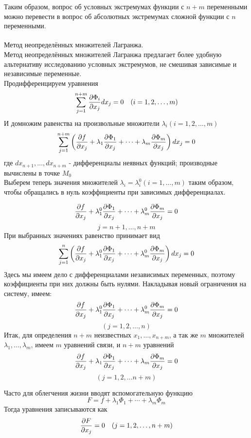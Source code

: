 Таким образом, вопрос об условных экстремумах функции с $n+m$ переменными можно перевести в вопрос об абсолютных экстремумах сложной функции с $n$ переменными.\\
\\

Метод неопределённых множителей Лагранжа.\\

Метод неопределённых множителей Лагранжа предлагает более удобную альтернативу исследованию условных экстремумов, не смешивая зависимые и независимые переменные.\\

Продифференцируем уравнения
$$\sum_{j = 1}^{n+m} {\partial \Phi_i \over \partial x_j}dx_j = 0 
\quad (i = 1,2,\dotsc,m)$$
И домножим равенства на произвольные множители $\lambda_i (i = 1,2,\dotsc,m)$
$$\sum_{j=1}^{n+m}\left(
{\partial f \over \partial x_j} + 
\lambda_1{\partial \Phi_1 \over \partial x_j} +
\dotsb +
\lambda_m{\partial \Phi_m \over \partial x_j} \right)dx_j
=0
$$
где $dx_{n+1}, \dotsc, dx_{n+m}$ - дифференциалы неявных функций; производные вычислены в точке $M_0$\\

Выберем теперь значения множителей $\lambda_i = \lambda_i^0 (i = 1, \dotsc, m)$ таким образом, чтобы обращались в нуль коэффициенты при зависимых дифференциалах.

$$
{\partial f \over \partial x_j} + 
\lambda_1^0{\partial \Phi_1 \over \partial x_j} +
\dotsb +
\lambda_m^0{\partial \Phi_m \over \partial x_j} = 0
$$
$$j=n+1,\dotsc,n+m$$
При выбранных значениях равенство принимает вид
$$\sum_{j=1}^{n}\left(
{\partial f \over \partial x_j} + 
\lambda_1^0{\partial \Phi_1 \over \partial x_j} +
\dotsb +
\lambda_m^0{\partial \Phi_m \over \partial x_j} \right)dx_j
= 0
$$
Здесь мы имеем дело с дифференциалами независимых переменных, поэтому коэффициенты
при них должны быть нулями. Накладывая новый ограничения на систему, имеем:
$$
{\partial f \over \partial x_j} +
\lambda_1^0{\partial \Phi_1 \over \partial x_j} +
\dotsb +
\lambda_m^0{\partial \Phi_m \over \partial x_j} = 0
$$
$$(j = 1, 2, \dotsc, n)$$
Итак, для определения $n+m$ неизвестных $x_1, \dotsc, x_{n+m}$, а так же $m$ множителей $\lambda_1,\dotsc, \lambda_m$, имеем $m$ уравнений связи, и $n+m$ уравнений
$$
{\partial f \over \partial x_j} +
\lambda_1{\partial \Phi_1 \over \partial x_j} +
\dotsb +
\lambda_m{\partial \Phi_m \over \partial x_j} = 0
$$
$$(j = 1, 2, \dotsc n+m)$$

Часто для облегчения жизни вводят вспомогательную функцию
$$F = f + 
\lambda_1\Phi_1 + 
\dotsb + 
\lambda_m\Phi_m
$$
Тогда уравнения записываются как
$${\partial F \over \partial x_j} = 0 \quad (j = 1, 2, \dotsc, n+m)$$

